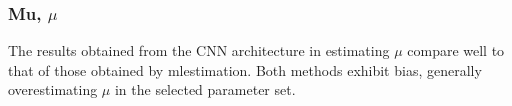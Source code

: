 \documentclass[11pt,oneside,openany,a4paper,english, report, goldenblock
]{usthesis}
\begin{document}
\subsubsection{Mu, $\mu$}
The results obtained from the CNN architecture in estimating $\mu$ compare well to that of those obtained by \acrshort{mlestimation}. Both methods exhibit bias, generally overestimating $\mu$ in the selected parameter set.
\begin{figure}[h]
\end{figure}
\end{document}
